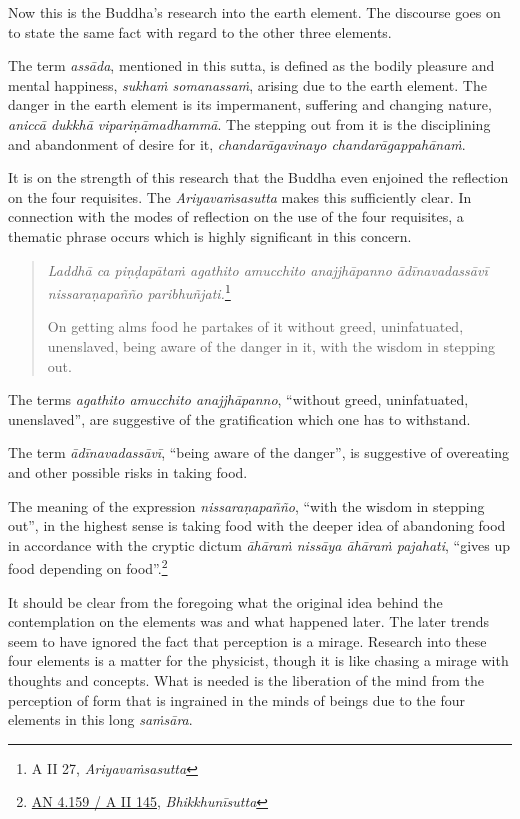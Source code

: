 Now this is the Buddha's research into the earth element. The discourse goes on to state the same fact with regard to the other three elements.

The term \emph{assāda}, mentioned in this sutta, is defined as the bodily pleasure and mental happiness, \emph{sukhaṁ somanassaṁ}, arising due to the earth element. The danger in the earth element is its impermanent, suffering and changing nature, \emph{aniccā dukkhā vipariṇāmadhammā}. The stepping out from it is the disciplining and abandonment of desire for it, \emph{chandarāgavinayo chandarāgappahānaṁ}.

It is on the strength of this research that the Buddha even enjoined the reflection on the four requisites. The \emph{Ariyavaṁsasutta} makes this sufficiently clear. In connection with the modes of reflection on the use of the four requisites, a thematic phrase occurs which is highly significant in this concern.

\begin{quote}
\emph{Laddhā ca piṇḍapātaṁ agathito amucchito anajjhāpanno ādīnavadassāvī nissaraṇapañño paribhuñjati.}\footnote{A II 27, \emph{Ariyavaṁsasutta}}

On getting alms food he partakes of it without greed, uninfatuated, unenslaved, being aware of the danger in it, with the wisdom in stepping out.
\end{quote}

The terms \emph{agathito amucchito anajjhāpanno}, ``without greed, uninfatuated, unenslaved'', are suggestive of the gratification which one has to withstand.

The term \emph{ādīnavadassāvī}, ``being aware of the danger'', is suggestive of overeating and other possible risks in taking food.

\clearpage

The meaning of the expression \emph{nissaraṇapañño}, ``with the wisdom in stepping out'', in the highest sense is taking food with the deeper idea of abandoning food in accordance with the cryptic dictum \emph{āhāraṁ nissāya āhāraṁ pajahati}, ``gives up food depending on food''.\footnote{\href{https://suttacentral.net/an4.159/pli/ms}{AN 4.159 / A II 145}, \emph{Bhikkhunīsutta}}

It should be clear from the foregoing what the original idea behind the contemplation on the elements was and what happened later. The later trends seem to have ignored the fact that perception is a mirage. Research into these four elements is a matter for the physicist, though it is like chasing a mirage with thoughts and concepts. What is needed is the liberation of the mind from the perception of form that is ingrained in the minds of beings due to the four elements in this long \emph{saṁsāra}.

